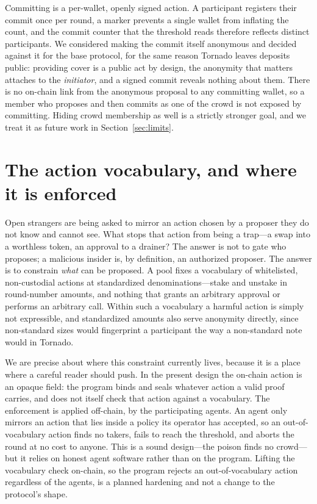\documentclass[11pt]{article}
\begin{document}
Committing is a per-wallet, openly signed action. A participant registers their
commit once per round, a marker prevents a single wallet from inflating the count,
and the commit counter that the threshold reads therefore reflects distinct
participants. We considered making the commit itself anonymous and decided against
it for the base protocol, for the same reason Tornado leaves deposits public:
providing cover is a public act by design, the anonymity that matters attaches to
the \emph{initiator}, and a signed commit reveals nothing about them. There is no
on-chain link from the anonymous proposal to any committing wallet, so a member
who proposes and then commits as one of the crowd is not exposed by committing.
Hiding crowd membership as well is a strictly stronger goal, and we treat it as
future work in Section~\ref{sec:limits}.

\section{The action vocabulary, and where it is enforced}
\label{sec:vocab}

Open strangers are being asked to mirror an action chosen by a proposer they do
not know and cannot see. What stops that action from being a trap---a swap into a
worthless token, an approval to a drainer? The answer is not to gate who
proposes; a malicious insider is, by definition, an authorized proposer. The
answer is to constrain \emph{what} can be proposed. A pool fixes a vocabulary of
whitelisted, non-custodial actions at standardized denominations---stake and
unstake in round-number amounts, and nothing that grants an arbitrary approval or
performs an arbitrary call. Within such a vocabulary a harmful action is simply
not expressible, and standardized amounts also serve anonymity directly, since
non-standard sizes would fingerprint a participant the way a non-standard note
would in Tornado.

We are precise about where this constraint currently lives, because it is a place
where a careful reader should push. In the present design the on-chain action is
an opaque field: the program binds and seals whatever action a valid proof
carries, and does not itself check that action against a vocabulary. The
enforcement is applied off-chain, by the participating agents. An agent only
mirrors an action that lies inside a policy its operator has accepted, so an
out-of-vocabulary action finds no takers, fails to reach the threshold, and
aborts the round at no cost to anyone. This is a sound design---the poison finds
no crowd---but it relies on honest agent software rather than on the program.
Lifting the vocabulary check on-chain, so the program rejects an out-of-vocabulary
action regardless of the agents, is a planned hardening and not a change to the
protocol's shape.
\end{document}
